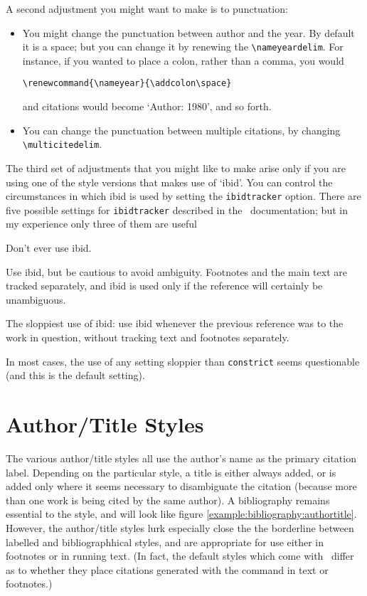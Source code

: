 A second adjustment you might want to make is to
punctuation:
\begin{itemize}
\item You might change the punctuation between author and the year. By
  default it is a space; but you can change it by renewing the
  \verb|\nameyeardelim|. For instance, if you wanted to place a colon,
  rather than a comma, you would
\begin{verbatim}
\renewcommand{\nameyear}{\addcolon\space}
\end{verbatim}
and citations would become `Author: 1980', and so forth.
\item You can change the punctuation between multiple citations, by
  changing \verb|\multicitedelim|.
\end{itemize}

The third set of adjustments that you might like to make arise only if
you are using one of the style versions that makes use of `ibid'. You
can control the circumstances in which ibid is used by setting the
\verb|ibidtracker| option.\label{ibidtracking} There are five possible
settings for \verb|ibidtracker| described in the \biblatex\
documentation; but in my experience only three of them are useful
\begin{description}[font=\ttfamily\upshape]
\item[ibidtracker=false] Don't ever use ibid.
\item[ibidtracker=constrict] Use ibid, but be cautious to avoid
  ambiguity. Footnotes and the main text are tracked separately, and
  ibid is used only if the reference will certainly be unambiguous.
\item[ibidtracker=true] The sloppiest use of ibid: use ibid whenever
  the previous reference was to the work in question, without tracking
  text and footnotes separately.
\end{description}
In most cases, the use of any setting sloppier than \texttt{constrict}
seems questionable (and this is the default setting).

\section{Author/Title Styles}

The various author/title styles all use the author's name as the
primary citation label. Depending on the particular style, a title is
either always added, or is added only where it seems necessary to
disambiguate the citation (because more than one work is being cited
by the same author). A bibliography remains essential to the style,
and will look like figure
\ref{example:bibliography:authortitle}. However, the author/title
styles lurk especially close the the borderline between labelled and
bibliographhical styles, and are appropriate for use either in
footnotes or in running text. (In fact, the default styles which come
with \biblatex\ differ as to whether they place citations generated
with the \cs{autocite} command in text or footnotes.)

